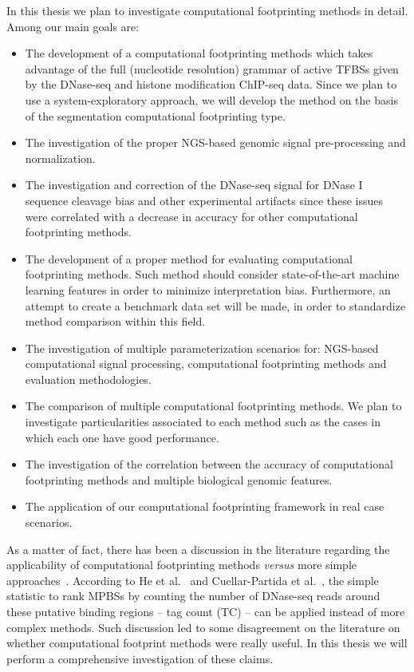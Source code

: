 In this thesis we plan to investigate computational footprinting methods in detail. Among our main goals are:
\begin{itemize}
\item The development of a computational footprinting methods which takes advantage of the full (nucleotide resolution) grammar of active TFBSs given by the DNase-seq and histone modification ChIP-seq data. Since we plan to use a system-exploratory approach, we will develop the method on the basis of the segmentation computational footprinting type.
\item The investigation of the proper NGS-based genomic signal pre-processing and normalization.
\item The investigation and correction of the DNase-seq signal for DNase I sequence cleavage bias and other experimental artifacts since these issues were correlated with a decrease in accuracy for other computational footprinting methods.
\item The development of a proper method for evaluating computational footprinting methods. Such method should consider state-of-the-art machine learning features in order to minimize interpretation bias. Furthermore, an attempt to create a benchmark data set will be made, in order to standardize method comparison within this field.
\item The investigation of multiple parameterization scenarios for: NGS-based computational signal processing, computational footprinting methods and evaluation methodologies.
\item The comparison of multiple computational footprinting methods. We plan to investigate particularities associated to each method such as the cases in which each one have good performance.
\item The investigation of the correlation between the accuracy of computational footprinting methods and multiple biological genomic features.
\item The application of our computational footprinting framework in real case scenarios.
\end{itemize}

As a matter of fact, there has been a discussion in the literature regarding the applicability of computational footprinting methods \emph{versus} more simple approaches~\cite{he2014,meyer2014}. According to He et al.~\cite{he2014} and Cuellar-Partida et al.~\cite{cuellar2012}, the simple statistic to rank MPBSs by counting the number of DNase-seq reads around these putative binding regions -- tag count (TC) -- can be applied instead of more complex methods. Such discussion led to some disagreement on the literature on whether computational footprint methods were really useful. In this thesis we will perform a comprehensive investigation of these claims.


